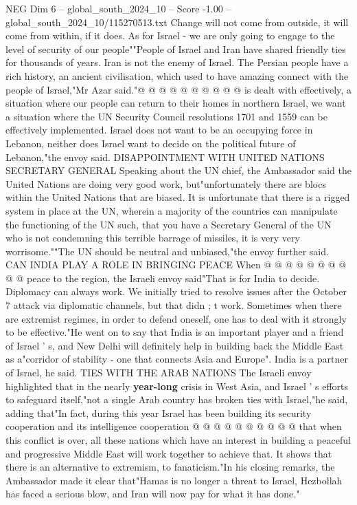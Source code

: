 \begin{textsample}{NEG Dim 6 – global\_south\_2024\_10 – Score -1.00 – global\_south\_2024\_10/115270513.txt}
Change will not come from outside, it will come from within, if it does.
As for Israel - we are only going to engage to the level of security of our people""People of Israel and Iran have shared friendly ties for thousands of years.
Iran is not the enemy of Israel.
The Persian people have a rich history, an ancient civilisation, which used to have amazing connect with the people of Israel,"Mr Azar said."@ @ @ @ @ @ @ @ @ @ is dealt with effectively, a situation where our people can return to their homes in northern Israel, we want a situation where the UN Security Council resolutions 1701 and 1559 can be effectively implemented.
Israel does not want to be an occupying force in Lebanon, neither does Israel want to decide on the political future of Lebanon,"the envoy said.
DISAPPOINTMENT WITH UNITED NATIONS SECRETARY GENERAL Speaking about the UN chief, the Ambassador said the United Nations are doing very good work, but"unfortunately there are blocs within the United Nations that are biased.
It is unfortunate that there is a rigged system in place at the UN, wherein a majority of the countries can manipulate the functioning of the UN such, that you have a Secretary General of the UN who is not condemning this terrible barrage of missiles, it is very very worrisome.""The UN should be neutral and unbiased,"the envoy further said.
CAN INDIA PLAY A ROLE IN BRINGING PEACE When @ @ @ @ @ @ @ @ @ @ peace to the region, the Israeli envoy said"That is for India to decide.
Diplomacy can always work.
We initially tried to resolve issues after the October 7 attack via diplomatic channels, but that didn ; t work.
Sometimes when there are extremist regimes, in order to defend oneself, one has to deal with it strongly to be effective."He went on to say that India is an important player and a friend of Israel ' s, and New Delhi will definitely help in building back the Middle East as a"corridor of stability - one that connects Asia and Europe".
India is a partner of Israel, he said.
TIES WITH THE ARAB NATIONS The Israeli envoy highlighted that in the nearly \textbf{year-long} crisis in West Asia, and Israel ' s efforts to safeguard itself,"not a single Arab country has broken ties with Israel,"he said, adding that"In fact, during this year Israel has been building its security cooperation and its intelligence cooperation @ @ @ @ @ @ @ @ @ @ that when this conflict is over, all these nations which have an interest in building a peaceful and progressive Middle East will work together to achieve that.
It shows that there is an alternative to extremism, to fanaticism."In his closing remarks, the Ambassador made it clear that"Hamas is no longer a threat to Israel, Hezbollah has faced a serious blow, and Iran will now pay for what it has done."

\end{textsample}
